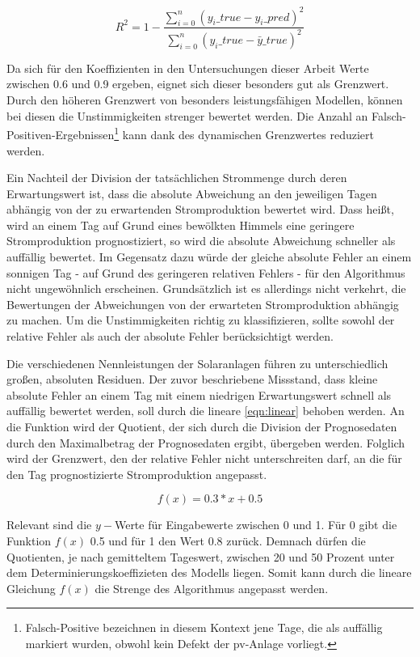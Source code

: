 \documentclass[12pt, a4paper]{article}
\begin{document}
\begin{equation}
\label{eqn:determinationcoefficient}
R^2=1-\frac{\sum_{i=0}^n(y_i\_true-y_i\_pred)^2}{\sum_{i=0}^n(y_i\_true-\bar{y}\_true)^2}
\end{equation}


Da sich für den Koeffizienten in den Untersuchungen dieser Arbeit Werte zwischen 0.6 und 0.9 ergeben, eignet sich dieser besonders gut als Grenzwert. Durch den höheren Grenzwert von besonders leistungsfähigen Modellen, können bei diesen die Unstimmigkeiten strenger bewertet werden. Die Anzahl an Falsch-Positiven-Ergebnissen\footnote{Falsch-Positive bezeichnen in diesem Kontext jene Tage, die als auffällig markiert wurden, obwohl kein Defekt der \ac{pv}-Anlage vorliegt.} kann dank des dynamischen Grenzwertes reduziert werden.

Ein Nachteil der Division der tatsächlichen Strommenge durch deren Erwartungswert ist, dass die absolute Abweichung an den jeweiligen Tagen abhängig von der zu erwartenden Stromproduktion bewertet wird. Dass heißt, wird an einem Tag auf Grund eines bewölkten Himmels eine geringere Stromproduktion prognostiziert, so wird die absolute Abweichung schneller als auffällig bewertet. Im Gegensatz dazu würde der gleiche absolute Fehler an einem sonnigen Tag - auf Grund des geringeren relativen Fehlers - für den Algorithmus nicht ungewöhnlich erscheinen. Grundsätzlich ist es allerdings nicht verkehrt, die Bewertungen der Abweichungen von der erwarteten Stromproduktion abhängig zu machen. Um die Unstimmigkeiten richtig zu klassifizieren, sollte sowohl der relative Fehler als auch der absolute Fehler berücksichtigt werden.  

Die verschiedenen Nennleistungen der Solaranlagen führen zu unterschiedlich großen, absoluten Residuen. Der zuvor beschriebene Missstand, dass kleine absolute Fehler an einem Tag mit einem niedrigen Erwartungswert schnell als auffällig bewertet werden, soll durch die lineare \autoref{eqn:linear} behoben werden. An die Funktion wird der Quotient, der sich durch die Division der Prognosedaten durch den Maximalbetrag der Prognosedaten ergibt, übergeben werden. Folglich wird der Grenzwert, den der relative Fehler nicht unterschreiten darf, an die für den Tag prognostizierte Stromproduktion angepasst.

\begin{equation}
\label{eqn:linear}
f(x)=0.3*x+0.5
\end{equation}

Relevant sind die $y-$Werte für Eingabewerte zwischen 0 und 1. Für 0 gibt die Funktion $f(x)$ 0.5 und für 1 den Wert 0.8 zurück. Demnach dürfen die Quotienten, je nach gemitteltem Tageswert, zwischen 20 und 50 Prozent unter dem Determinierungskoeffizieten des Modells liegen. Somit kann durch die lineare Gleichung $f(x)$ die Strenge des Algorithmus angepasst werden.
\end{document}
